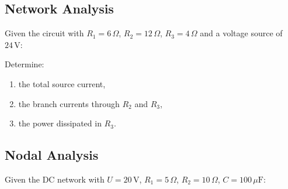 \documentclass[a4paper,12pt]{article}
\newif\ifshowsolutions
\begin{document}
\subsection{Network Analysis}

Given the circuit with $R_1 = 6\,\Omega$, $R_2 = 12\,\Omega$, $R_3 = 4\,\Omega$ and a voltage source of $24\,\mathrm{V}$:

\begin{center}
\end{center}

Determine:

\begin{enumerate}
  \item the total source current,
  \item the branch currents through $R_2$ and $R_3$,
  \item the power dissipated in $R_3$.
\end{enumerate}

\ifshowsolutions
Solution:
\[
R_{23} = \frac{12 \cdot 4}{16} = 3\,\Omega
\]
\[
R = 6 + 3 = 9\,\Omega
\]
\[
I = \frac{24}{9} = 2.67\,\text{A}
\]
\[
U_{23} = I \cdot 3 = 8\,\text{V}
\]
\[
I_2 = \frac{8}{12} = 0.67\,\text{A}, \quad I_3 = \frac{8}{4} = 2\,\text{A}
\]
\[
P_3 = I_3^2 R_3 = 16\,\text{W}
\]
\fi

\subsection{Nodal Analysis}

Given the DC network with $U = 20\,\mathrm{V}$, $R_1 = 5\,\Omega$, $R_2 = 10\,\Omega$, $C = 100\,\mu\mathrm{F}$:

\begin{center}
\end{center}
\end{document}
